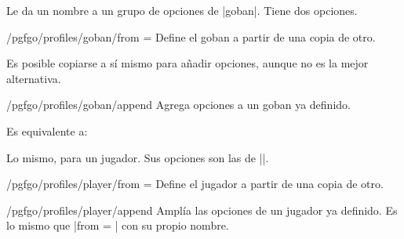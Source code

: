 \begin{command}{\pgfgodefinegoban{}}
	Le da un nombre a un grupo de opciones de |goban|. Tiene dos opciones.
	
	\begin{key}{/pgfgo/profiles/goban/from = }
		Define el goban a partir de una copia de otro.
		\begin{codeexample}
		\end{codeexample}
		
		Es posible copiarse a sí mismo para añadir opciones, aunque no es la mejor alternativa.
		\begin{codeexample}
		\end{codeexample}
	\end{key}
	
	\begin{key}{/pgfgo/profiles/goban/append}
		Agrega opciones a un goban ya definido.
		\begin{codeexample}
		\end{codeexample}
		Es equivalente a:
		\begin{codeexample}
		\end{codeexample}
	\end{key}
\end{command}

\begin{command}{\pgfgodefineplayer{}}
	Lo mismo, para un jugador. Sus opciones son las de |\pgfgodefinegoban|.

	\begin{key}{/pgfgo/profiles/player/from = }
		Define el jugador a partir de una copia de otro.
	\end{key}

	\begin{key}{/pgfgo/profiles/player/append}
		Amplía las opciones de un jugador ya definido. Es lo mismo que |from = | con su propio nombre.
	\end{key}
\end{command}

